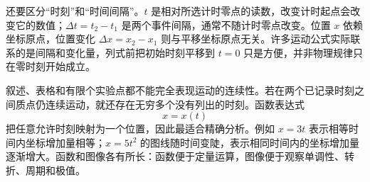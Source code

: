 还要区分“时刻”和“时间间隔”。$t$ 是相对所选计时零点的读数，改变计时起点会改变它的数值；$\Delta t=t_2-t_1$ 是两个事件间隔，通常不随计时零点改变。位置 $x$ 依赖坐标原点，位置变化 $\Delta x=x_2-x_1$ 则与平移坐标原点无关。许多运动公式实际联系的是间隔和变化量，列式前把初始时刻平移到 $t=0$ 只是方便，并非物理规律只在零时刻开始成立。

叙述、表格和有限个实验点都不能完全表现运动的连续性。若在两个已记录时刻之间质点仍连续运动，就还存在无穷多个没有列出的时刻。函数表达式
\begin{equation}
  x=x(t)
\end{equation}
把任意允许时刻映射为一个位置，因此最适合精确分析。例如 $x=3t$ 表示相等时间内坐标增加量相等；$x=5t^2$ 的图线随时间变陡，表示相同时间内的坐标增加量逐渐增大。函数和图像各有所长：函数便于定量运算，图像便于观察单调性、转折、周期和极值。

